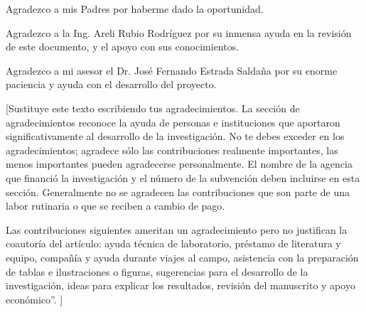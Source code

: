 \begin{thanks}

Agradezco a mis Padres por haberme dado la oportunidad.

Agradezco a la Ing. Areli Rubio Rodríguez por su inmensa ayuda en la revisión de este documento, y el apoyo con sus conocimientos.

Agradezco a mi asesor el Dr. José Fernando Estrada Saldaña por su enorme paciencia y ayuda con el desarrollo del proyecto.

[Sustituye este texto escribiendo tus agradecimientos.
La sección de agradecimientos reconoce la ayuda de personas e instituciones que aportaron significativamente al desarrollo de la investigación. No te debes exceder en los agradecimientos; agradece sólo las contribuciones realmente importantes, las menos importantes pueden agradecerse personalmente. El nombre de la agencia que financió la investigación y el número de la subvención deben incluirse en esta sección. Generalmente no se agradecen las contribuciones que son parte de una labor rutinaria o que se reciben a cambio de pago.

         Las contribuciones siguientes ameritan un agradecimiento pero no justifican la coautoría del artículo: ayuda técnica de laboratorio, préstamo de literatura y equipo, compañía y ayuda durante viajes al campo, asistencia con la preparación de tablas e ilustraciones o figuras, sugerencias para el desarrollo de la investigación, ideas para explicar los resultados, revisión del manuscrito y apoyo económico”.
]


\end{thanks}
